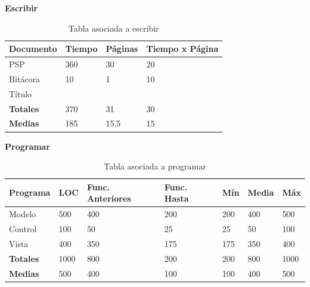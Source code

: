 \documentclass[a4paper,12pt,openany,oneside]{book}
\begin{document}
\begin{table}
\textbf{Escribir}\\
\begin{tabular}{| l | l | l | l |}
\hline
\textbf{Documento} & \textbf{Tiempo} & \textbf{Páginas} & \textbf{Tiempo x Página}\\
\hline
PSP & 360 & 30 & 20 \\
\hline
Bitácora & 10 & 1 & 10 \\
\hline
Título & & & \\
\hline
\textbf{Totales} & 370 & 31 & 30 \\
\hline
\textbf{Medias} & 185 & 15,5 & 15 \\
\hline
\end{tabular}
\caption{Tabla asociada a escribir}
\end{table}
\begin{table}
\textbf{Programar}\\
\begin{tabular}{| l | l | l | l | l | l | l |}
\hline
\textbf{Programa} & \textbf{LOC} & \textbf{Func. Anteriores} & \textbf{Func. Hasta} & \textbf{Mín} & \textbf{Media} & \textbf{Máx}\\
\hline
Modelo & 			500  & 400 & 200 & 200 & 400 & 500 \\
\hline
Control &			100  & 50  & 25  & 25  & 50  & 100 \\
\hline
Vista &  			400  & 350 & 175 & 175 & 350 & 400\\
\hline
\textbf{Totales} &	1000 & 800 & 200 & 200 & 800 & 1000 \\
\hline
\textbf{Medias} & 	500	 & 400 & 100 & 100 & 400 & 500\\
\hline
\end{tabular}
\caption{Tabla asociada a programar}
\end{table}
\end{document}
